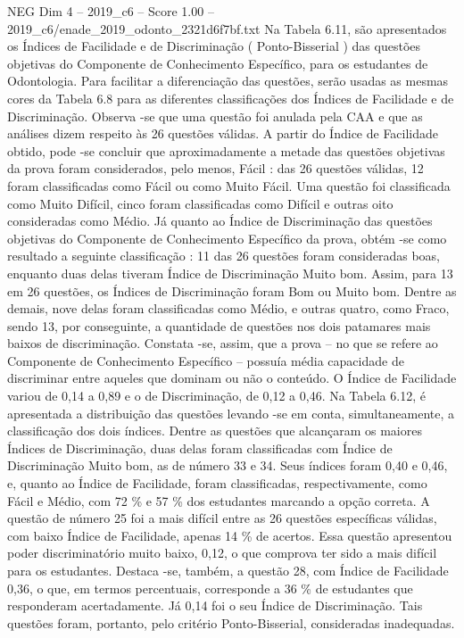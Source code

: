 \begin{textsample}{NEG Dim 4 – 2019\_c6 – Score 1.00 – 2019\_c6/enade\_2019\_odonto\_2321d6f7bf.txt}
Na Tabela 6.11, são apresentados os Índices de Facilidade e de Discriminação ( Ponto-Bisserial ) das questões objetivas do Componente de Conhecimento Específico, para os estudantes de Odontologia.
Para facilitar a diferenciação das questões, serão usadas as mesmas cores da Tabela 6.8 para as diferentes classificações dos Índices de Facilidade e de Discriminação.
Observa -se que uma questão foi anulada pela CAA e que as análises dizem respeito às 26 questões válidas.
A partir do Índice de Facilidade obtido, pode -se concluir que aproximadamente a metade das questões objetivas da prova foram considerados, pelo menos, Fácil : das 26 questões válidas, 12 foram classificadas como Fácil ou como Muito Fácil.
Uma questão foi classificada como Muito Difícil, cinco foram classificadas como Difícil e outras oito consideradas como Médio.
Já quanto ao Índice de Discriminação das questões objetivas do Componente de Conhecimento Específico da prova, obtém -se como resultado a seguinte classificação : 11 das 26 questões foram consideradas boas, enquanto duas delas tiveram Índice de Discriminação Muito bom.
Assim, para 13 em 26 questões, os Índices de Discriminação foram Bom ou Muito bom.
Dentre as demais, nove delas foram classificadas como Médio, e outras quatro, como Fraco, sendo 13, por conseguinte, a quantidade de questões nos dois patamares mais baixos de discriminação.
Constata -se, assim, que a prova – no que se refere ao Componente de Conhecimento Específico – possuía média capacidade de discriminar entre aqueles que dominam ou não o conteúdo.
O Índice de Facilidade variou de 0,14 a 0,89 e o de Discriminação, de 0,12 a 0,46.
Na Tabela 6.12, é apresentada a distribuição das questões levando -se em conta, simultaneamente, a classificação dos dois índices.
Dentre as questões que alcançaram os maiores Índices de Discriminação, duas delas foram classificadas com Índice de Discriminação Muito bom, as de número 33 e 34.
Seus índices foram 0,40 e 0,46, e, quanto ao Índice de Facilidade, foram classificadas, respectivamente, como Fácil e Médio, com 72 \% e 57 \% dos estudantes marcando a opção correta.
A questão de número 25 foi a mais difícil entre as 26 questões específicas válidas, com baixo Índice de Facilidade, apenas 14 \% de acertos.
Essa questão apresentou poder discriminatório muito baixo, 0,12, o que comprova ter sido a mais difícil para os estudantes.
Destaca -se, também, a questão 28, com Índice de Facilidade 0,36, o que, em termos percentuais, corresponde a 36 \% de estudantes que responderam acertadamente.
Já 0,14 foi o seu Índice de Discriminação.
Tais questões foram, portanto, pelo critério Ponto-Bisserial, consideradas inadequadas.

\end{textsample}
